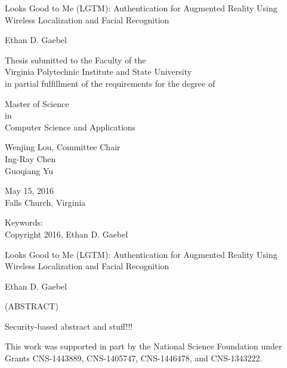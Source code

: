 \documentclass[12pt,dvips]{report}
\begin{document}
\thispagestyle{empty}
\begin{center}

{\Large 
Looks Good to Me (LGTM): 
Authentication for Augmented Reality Using Wireless Localization and Facial Recognition
}

\vfill

Ethan D. Gaebel

\vfill

Thesis submitted to the Faculty of the \\
Virginia Polytechnic Institute and State University \\
in partial fulfillment of the requirements for the degree of

\vfill

Master of Science \\
in \\
Computer Science and Applications

\vfill

Wenjing Lou, Committee Chair \\
Ing-Ray Chen \\
Guoqiang Yu 

\vfill

May 15, 2016 \\
Falls Church, Virginia

\vfill

Keywords: 
\\
Copyright 2016, Ethan D. Gaebel

\end{center}

\pagebreak

\thispagestyle{empty}
\begin{center}

{\large Looks Good to Me (LGTM): 
Authentication for Augmented Reality Using Wireless Localization and Facial Recognition}

\vfill

Ethan D. Gaebel

\vfill

(ABSTRACT)

\vfill

\end{center}

Security-based abstract and stuff!!!

\vfill

This work was supported in part by the National Science Foundation under Grants 
CNS-1443889, CNS-1405747, CNS-1446478, and CNS-1343222.
\end{document}
